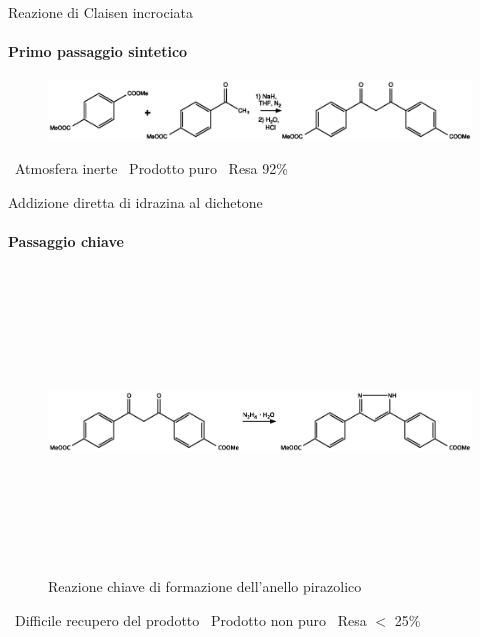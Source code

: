 \documentclass[aspectration=169]{beamer}
\newcommand{\B}{\textcolor{maincolor}{\textbullet}}
\begin{document}
\begin{frame}{Reazione di Claisen incrociata}
	\centering
	\framesubtitle{Primo passaggio sintetico}
	\begin{figure}[h!]
		\centering
		\includegraphics[width=13cm,keepaspectratio]{illustration/claisen.eps}
	\end{figure}
	\vspace{0.5cm}
	\B \ Atmosfera inerte \hspace{1cm} \B \ Prodotto puro \hspace{1cm} \B \ Resa 92\%
\end{frame}


\begin{frame}{Addizione diretta di idrazina al dichetone}
	\centering
	\framesubtitle{Passaggio chiave}
	\begin{figure}[h]
		\includegraphics[width=13cm,height=8cm,keepaspectratio]{../Structures/pyrazole-form.eps}
		\caption{Reazione chiave di formazione dell'anello pirazolico}
	\end{figure}
	\vspace{0.5cm}
	\B \ Difficile recupero del prodotto \hspace{0.6cm} \B \ Prodotto non puro \hspace{0.6cm} \B \ Resa \(<\) 25\%
\end{frame}
\end{document}
